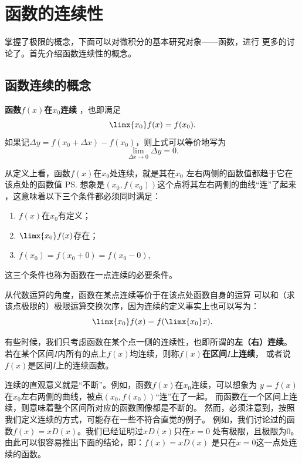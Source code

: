 \section{函数的连续性}

掌握了极限的概念，下面可以对微积分的基本研究对象——函数，进行
更多的讨论了。首先介绍函数连续性的概念。

\subsection{函数连续的概念}

\begin{thx}
{\bf 函数$f(x)$在$x_0$连续}
，也即满足
	$$\limx{x_0}f(x)=f(x_0).$$
	如果记$\Delta y=f(x_0+\Delta x)-f(x_0)$，则上式可以等价地写为
	$$\lim\limits_{\Delta x\to 0}\Delta y=0.$$
\end{thx}

从定义上看，函数$f(x)$在$x_0$处连续，就是其在$x_0$
左右两侧的函数值都趋于它在该点处的函数值
\ps{想象是$(x_0,f(x_0))$这个点将其左右两侧的曲线“连”了起来}
，这意味着以下三个条件都必须同时满足：
\begin{enumerate}[(1)]
	\setlength{\itemindent}{1cm}
	\item $f(x)$在$x_0$有定义； 
	\item $\limx{x_0}f(x)$存在； 
	\item $f(x_0)=f(x_0+0)=f(x_0-0)$,
\end{enumerate}
这三个条件也称为函数在一点连续的必要条件。

\bs
从代数运算的角度，函数在某点连续等价于在该点处函数自身的运算
可以和（求该点极限的）极限运算交换次序，因为连续的定义事实上也可以写为：
$$\limx{x_0}f(x)=f(\limx{x_0}x).$$

\bs
有些时候，我们只考虑函数在某个点一侧的连续性，也即所谓的{\bf 左（右）连续}。
若在某个区间$I$内所有的点上$f(x)$均连续，则称{\bf $f(x)$在区间$I$上连续}，
或者说{$f(x)$是区间$I$上的连续函数}。

\bs
连续的直观意义就是“不断”。例如，函数$f(x)$在$x_0$连续，可以想象为
$y=f(x)$在$x_0$左右两侧的曲线，被点$(x_0,f(x_0))$“连”在了一起。
而函数在一个区间上连续，则意味着整个区间所对应的函数图像都是不断的。
然而，必须注意到，按照我们定义连续的方式，可能存在一些不符合直觉的例子。
例如，我们讨论过的函数$f(x)=xD(x)$。我们已经证明过$xD(x)$只在$x=0$
处有极限，且极限为$0$。由此可以很容易推出下面的结论，即：$f(x)=xD(x)$
是只在$x=0$这一点处连续的函数。

